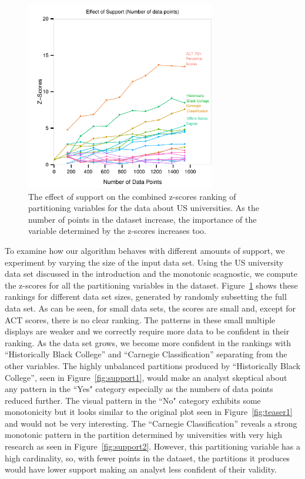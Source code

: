 \begin{figure}
\centering
\includegraphics[width=3.25in,height=3.25in]{images/support-nogrid.pdf}
  \caption{The effect of support on the combined z-scores ranking of partitioning variables for the data about US universities. As the number of points in the dataset increase, the importance of the variable determined by the z-scores increases too. }
 \label{fig:support}
\end{figure}

To examine how our algorithm behaves with different amounts of support, we experiment by varying the size of the input data set. Using the US university data set discussed in the introduction and the monotonic scagnostic, we compute the z-scores for all the partitioning variables in the dataset. Figure~\ref{fig:support} shows these rankings for different data set sizes, generated by randomly subsetting the full data set.
As can be seen, for small data sets, the scores are small and, except for ACT scores, there is no clear ranking. The patterns in these small multiple displays are weaker and we correctly require more data to be confident in their ranking. As the data set grows, we become more confident in the rankings with ``Historically Black College'' and ``Carnegie Classification'' separating from the other variables. 
The highly unbalanced partitions produced by ``Historically Black College'', seen in Figure~\ref{fig:support1}, would make an analyst skeptical about any pattern in the ``Yes" category especially as the numbers of data points reduced further. The visual pattern in the ``No" category exhibits some monotonicity but it looks similar to the original plot seen in Figure~\ref{fig:teaser1} and would not be very interesting.
The ``Carnegie Classification'' reveals a strong monotonic pattern in the partition determined by universities with very high research as seen in Figure~\ref{fig:support2}. However, this partitioning variable has a high cardinality, so, with fewer points in the dataset, the partitions it produces would have lower support making an analyst less confident of their validity.

